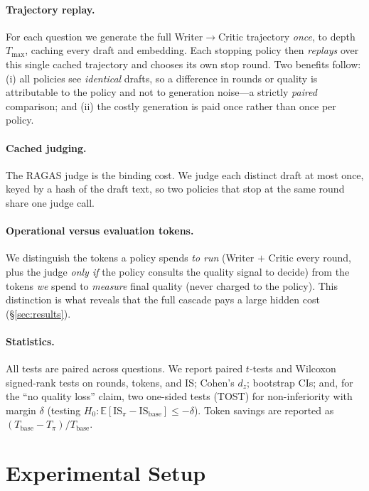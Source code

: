 \documentclass[conference]{IEEEtran}
\begin{document}
\paragraph{Trajectory replay.} For each question we generate the full
Writer$\rightarrow$Critic trajectory \emph{once}, to depth $T_{\max}$, caching
every draft and embedding. Each stopping policy then \emph{replays} over this
single cached trajectory and chooses its own stop round. Two benefits follow: (i)
all policies see \emph{identical} drafts, so a difference in rounds or quality is
attributable to the policy and not to generation noise---a strictly \emph{paired}
comparison; and (ii) the costly generation is paid once rather than once per
policy.

\paragraph{Cached judging.} The RAGAS judge is the binding cost. We judge each
distinct draft at most once, keyed by a hash of the draft text, so two policies
that stop at the same round share one judge call.

\paragraph{Operational versus evaluation tokens.} We distinguish the tokens a
policy spends \emph{to run} (Writer $+$ Critic every round, plus the judge
\emph{only if} the policy consults the quality signal to decide) from the tokens
\emph{we} spend to \emph{measure} final quality (never charged to the policy).
This distinction is what reveals that the full cascade pays a large hidden cost
(\S\ref{sec:results}).

\paragraph{Statistics.} All tests are paired across questions. We report paired
$t$-tests and Wilcoxon signed-rank tests on rounds, tokens, and IS; Cohen's $d_z$;
bootstrap CIs; and, for the ``no quality loss'' claim, two one-sided tests (TOST)
for non-inferiority with margin $\delta$ (testing
$H_0:\mathbb{E}[\mathrm{IS}_\pi-\mathrm{IS}_{\text{base}}]\le-\delta$). Token
savings are reported as $(T_{\text{base}}-T_\pi)/T_{\text{base}}$.

\section{Experimental Setup}\label{sec:setup}
\end{document}
